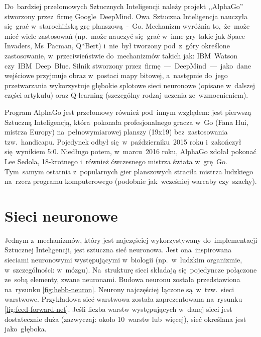 \documentclass[oneside, 11pt, a4paper]{article}
\begin{document}
\begin{multicols}{2}
\begin{figure}[H]
\end{figure}
\vspace{-0.3cm}
Do~bardziej przełomowych Sztucznych Inteligencji należy projekt ,,AlphaGo''\cite{AlphaGO} stworzony przez~firmę Google~DeepMind. Owa~Sztuczna Inteligencja nauczyła się~grać w~starochińską grę planszową~-~Go. Mechanizm wyróżnia to,~że~może mieć wiele zastosowań (np.~może nauczyć się~grać w~inne gry takie jak Space Invaders, Ms~Pacman, Q*Bert) i~nie~był tworzony pod~z~góry określone zastosowanie, w~przeciwieństwie do~mechanizmów takich jak: IBM~Watson czy~IBM~Deep~Blue. Silnik stworzony przez~firmę~---~DeepMind~---~jako~dane wejściowe przyjmuje obraz w~postaci mapy bitowej, a~następnie do~jego przetwarzania wykorzystuje głębokie splotowe sieci neuronowe (opisane w~dalszej części artykułu) oraz Q-learning (szczególny rodzaj uczenia ze~wzmocnieniem).

Program AlphaGo jest przełomowy również pod~innym względem: jest pierwszą Sztuczną Inteligencją, która~pokonała profesjonalnego gracza w~Go (Fana Hui, mistrza Europy)\cite{FanHuiGO} na~pełnowymiarowej planszy (19x19) bez~zastosowania tzw.~handicapu. Pojedynek odbył się~w~październiku~2015 roku i~zakończył się~wynikiem 5:0. Niedługo potem, w~marcu~2016 roku, AlphaGo zdołał pokonać Lee Sedola\cite{LeeSedolGO}, 18-krotnego i~również ówczesnego mistrza świata w~grę~Go. Tym~samym ostatnia z~popularnych gier planszowych straciła mistrza ludzkiego na~rzecz programu komputerowego (podobnie jak~wcześniej warcaby\cite{checkersSolved} czy~szachy\cite{newborn1997kasparov}).

\section{Sieci neuronowe}
Jednym z~mechanizmów, który jest najczęściej wykorzystywany do~implementacji Sztucznej Inteligencji, jest sztuczna sieć neuronowa. Jest ona~inspirowana sieciami neuronowymi występującymi w~biologii (np.~w~ludzkim organizmie, w~szczególności: w~mózgu). Na~strukturę sieci składają się~pojedyncze połączone ze~sobą elementy, zwane neuronami. Budowa neuronu została przedstawiona na~rysunku \ref{fig:hebb-neuron}. Neurony najczęściej łączone są~w~tzw.~sieci warstwowe. Przykładowa sieć warstwowa została zaprezentowana na~rysunku \ref{fig:feed-forward-net}. Jeśli liczba warstw występujących w~danej sieci jest dostatecznie duża (zazwyczaj: około 10~warstw lub~więcej), sieć określana jest jako~głęboka.


\end{multicols}
\end{document}
